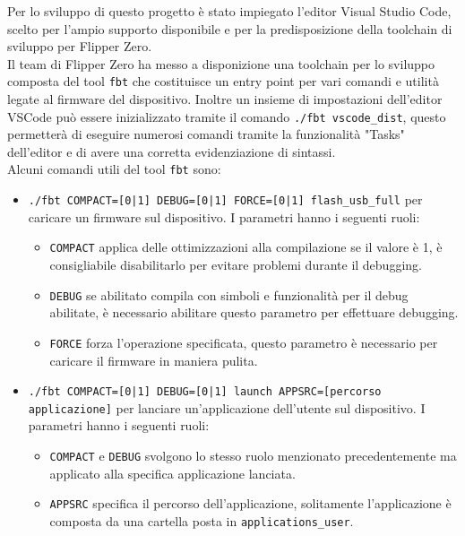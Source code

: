 Per lo sviluppo di questo progetto è stato impiegato l'editor Visual Studio Code, scelto per l'ampio supporto disponibile e per la predisposizione della toolchain di sviluppo per Flipper Zero.\\
Il team di Flipper Zero ha messo a disponizione una toolchain per lo sviluppo composta del tool \texttt{fbt} \cite{fbt} che costituisce un entry point per vari comandi e utilità legate al firmware del dispositivo. Inoltre un insieme di impostazioni dell'editor VSCode può essere inizializzato tramite il comando \texttt{./fbt vscode\_dist}, questo permetterà di eseguire numerosi comandi tramite la funzionalità "Tasks" dell'editor e di avere una corretta evidenziazione di sintassi.\\
Alcuni comandi utili del tool \texttt{fbt} sono:
\begin{itemize}
  \item \texttt{./fbt COMPACT=[0|1] DEBUG=[0|1] FORCE=[0|1] flash\_usb\_full} per caricare un firmware sul dispositivo. I parametri hanno i seguenti ruoli:
  \begin{itemize}
    \item \texttt{COMPACT} applica delle ottimizzazioni alla compilazione se il valore è 1, è consigliabile disabilitarlo per evitare problemi durante il debugging.
    \item \texttt{DEBUG} se abilitato compila con simboli e funzionalità per il debug abilitate, è necessario abilitare questo parametro per effettuare debugging.
    \item \texttt{FORCE} forza l'operazione specificata, questo parametro è necessario per caricare il firmware in maniera pulita.
  \end{itemize}
  \item \texttt{./fbt COMPACT=[0|1] DEBUG=[0|1] launch APPSRC=[percorso applicazione]} per lanciare un'applicazione dell'utente sul dispositivo. I parametri hanno i seguenti ruoli:
  \begin{itemize}
    \item \texttt{COMPACT} e \texttt{DEBUG} svolgono lo stesso ruolo menzionato precedentemente ma applicato alla specifica applicazione lanciata.
    \item \texttt{APPSRC} specifica il percorso dell'applicazione, solitamente l'applicazione è composta da una cartella posta in \texttt{applications\_user}.
  \end{itemize}
\end{itemize}

